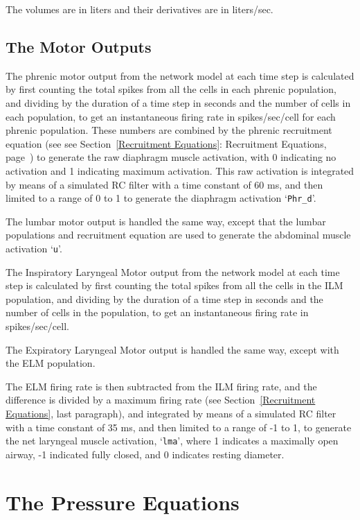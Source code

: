 \documentclass[12pt,openany,oneside]{book}
\newcommand{\tisamp}[1]{`\texttt{#1}'}
\newcommand{\tixref}[1]{see Section~\ref{#1}: #1, page~\pageref{#1}}
\begin{document}
The volumes are in liters and their derivatives are in liters/sec.

\subsection{The Motor Outputs}

\label{Phrd}
The phrenic motor output from the network model at each time step is
calculated by first counting the total spikes from all the cells in
each phrenic population, and dividing by the duration of a time step
in seconds and the number of cells in each population, to get an
instantaneous firing rate in spikes/sec/cell for each phrenic
population.  These numbers are combined by the phrenic recruitment
equation (see \tixref{Recruitment Equations}) to generate the raw
diaphragm muscle activation, with 0 indicating no activation and 1
indicating maximum activation.  This raw activation is integrated by
means of a simulated RC filter with a time constant of 60 ms, and then
limited to a range of 0 to 1 to generate the diaphragm activation
\tisamp{Phr\_d}.

The lumbar motor output is handled the same way, except that the
lumbar populations and recruitment equation are used to generate the
abdominal muscle activation \tisamp{u}.

The Inspiratory Laryngeal Motor output from the network model at each
time step is calculated by first counting the total spikes from all
the cells in the ILM population, and dividing by the duration of
a time step in seconds and the number of cells in the population, to
get an instantaneous firing rate in spikes/sec/cell.

The Expiratory Laryngeal Motor output is handled the same way, except
with the ELM population.

The ELM firing rate is then subtracted from the ILM firing rate, and
the difference is divided by a maximum firing rate (see
Section~\ref{Recruitment Equations}, last paragraph), and integrated
by means of a simulated RC filter with a time constant of 35 ms, and
then limited to a range of -1 to 1, to generate the net laryngeal
muscle activation, \tisamp{lma}, where 1 indicates a maximally open
airway, -1 indicated fully closed, and 0 indicates resting diameter.

\section{The Pressure Equations}
\end{document}
